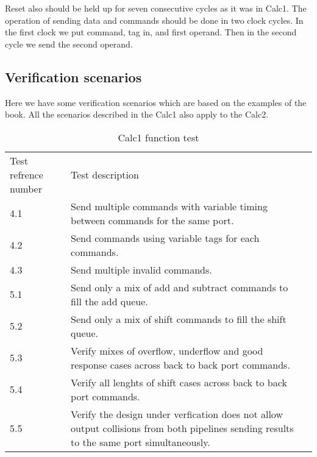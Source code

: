 \documentclass[a4paper, 11pt]{article}
\begin{document}
Reset also should be held up for seven consecutive cycles as it was in Calc1.
The operation of sending data and commands should be done in two clock cycles.
In the first clock we put command, tag in, and first operand. 
Then in the second cycle we send the second operand. 

\subsection{Verification scenarios}
Here we have some verification scenarios which are based on the examples of the
book. All the scenarios described in the Calc1 also apply to the Calc2.
\begin{table}[H]
    \centering
    \begin{tabular}{lp{12cm}l}
        \toprule
        Test refrence number& Test description\\
        \cmidrule(r){1-1}\cmidrule(lr){2-2}
        4.1 & Send multiple commands with variable timing between commands
        for the same port. \\
        4.2 & Send commands using variable tags for each commands. \\
        4.3 & Send multiple invalid commands. \\
        5.1 & Send only a mix of add and subtract commands to fill the add
        queue. \\
        5.2 & Send only a mix of shift commands to fill the shift queue. \\
        5.3 & Verify mixes of overflow, underflow and good response cases
        across back to back port commands. \\ 
        5.4 & Verify all lenghts of shift cases across back to back port 
        commands. \\ 
        5.5 & Verify the design under verfication does not allow output
        collisions from both pipelines sending results to the same port
        simultaneously.\\
        \bottomrule
    \end{tabular}
    \caption{Calc1 function test}
    \label{table:4}
\end{table}


\end{document}
